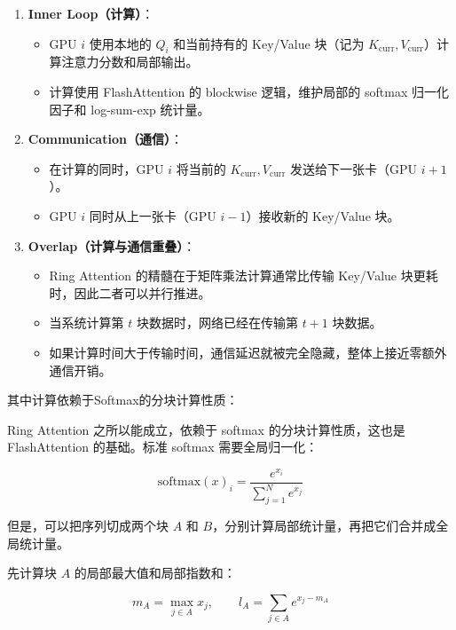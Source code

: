 \begin{enumerate}
\def\labelenumi{\arabic{enumi}.}
\tightlist
\item
  \textbf{Inner Loop（计算）}：

  \begin{itemize}
  \tightlist
  \item
    GPU \(i\) 使用本地的 \(Q_i\) 和当前持有的 Key/Value 块（记为 \(K_{\mathrm{curr}}, V_{\mathrm{curr}}\)）计算注意力分数和局部输出。
  \item
    计算使用 FlashAttention 的 blockwise 逻辑，维护局部的 softmax 归一化因子和 log-sum-exp 统计量。
  \end{itemize}
\item
  \textbf{Communication（通信）}：

  \begin{itemize}
  \tightlist
  \item
    在计算的同时，GPU \(i\) 将当前的 \(K_{\mathrm{curr}}, V_{\mathrm{curr}}\) 发送给下一张卡（GPU \(i+1\)）。
  \item
    GPU \(i\) 同时从上一张卡（GPU \(i-1\)）接收新的 Key/Value 块。
  \end{itemize}
\item
  \textbf{Overlap（计算与通信重叠）}：

  \begin{itemize}
  \tightlist
  \item
    Ring Attention 的精髓在于矩阵乘法计算通常比传输 Key/Value 块更耗时，因此二者可以并行推进。
  \item
    当系统计算第 \(t\) 块数据时，网络已经在传输第 \(t+1\) 块数据。
  \item
    如果计算时间大于传输时间，通信延迟就被完全隐藏，整体上接近零额外通信开销。
  \end{itemize}
\end{enumerate}

其中计算依赖于Softmax的分块计算性质：

Ring Attention 之所以能成立，依赖于 softmax 的分块计算性质，这也是 FlashAttention 的基础。标准 softmax 需要全局归一化：

\[
\mathrm{softmax}(x)_i = \frac{e^{x_i}}{\sum_{j=1}^{N} e^{x_j}}
\]

但是，可以把序列切成两个块 \(A\) 和 \(B\)，分别计算局部统计量，再把它们合并成全局统计量。

先计算块 \(A\) 的局部最大值和局部指数和：

\[
m_A = \max_{j \in A} x_j,\qquad
l_A = \sum_{j \in A} e^{x_j - m_A}
\]

